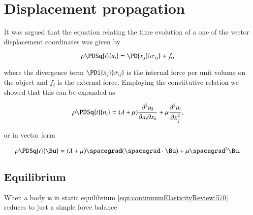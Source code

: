% 
% 
% 
% 
% 
% 
% 
% 
% 
% 
% 
% 
\chapter{Displacement propagation}

It was argued that the equation relating the time evolution of a one of the vector displacement coordinates was given by

\begin{equation}\label{eqn:continuumElasticityReview:570}
\rho \PDSq{t}{u_i} = \PD{x_j}{\sigma_{ij}} + f_i,
\end{equation}

where the divergence term $\PDi{x_j}{\sigma_{ij}}$ is the internal force per unit volume on the object and $f_i$ is the external force.  Employing the constitutive relation we showed that this can be expanded as

\begin{equation}\label{eqn:continuumElasticityReview:590}
\rho \PDSq{t}{u_i} = (\lambda + \mu) \frac{\partial^2 u_k}{\partial x_i \partial x_k}
+ \mu
\frac{\partial^2 u_i}
{\partial x_j^2
},
\end{equation}

or in vector form

\begin{equation}\label{eqn:continuumElasticityReview:610}
\rho \PDSq{t}{\Bu} = (\lambda + \mu) \spacegrad (\spacegrad \cdot \Bu) + \mu \spacegrad^2 \Bu.
\end{equation}

\section{Equilibrium}

When a body is in static equilibrium \ref{eqn:continuumElasticityReview:570} reduces to just a simple force balance

